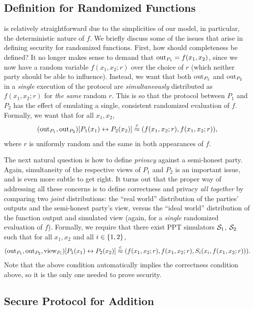 \documentclass[11pt]{article}
\begin{document}
\subsection{Definition for Randomized Functions}
\label{sec:defin-rand-funct}

 is relatively straightforward due to
the simplicities of our model, in particular, the deterministic nature
of $f$.  We briefly discuss some of the issues that arise in defining
security for randomized functions.  First, how should completeness be
defined?  It no longer makes sense to demand that $\text{out}_{P_{1}} =
f(x_{1}, x_{2})$, since we now have a random variable $f(x_{1}, x_{2};
r)$ over the choice of $r$ (which neither party should be able to
influence).  Instead, we want that both $\text{out}_{P_{1}}$ and
$\text{out}_{P_{2}}$ in a \emph{single} execution of the protocol are
\emph{simultaneously} distributed as $f(x_{1}, x_{2}; r)$ for
\emph{the same} random $r$.  This is so that the protocol between
$P_{1}$ and $P_{2}$ has the effect of emulating a single, consistent
randomized evaluation of $f$.  Formally, we want that for all $x_{1},
x_{2}$, \[ (\text{out}_{P_{1}}, \text{out}_{P_{2}})[P_{1}(x_{1}) \leftrightarrow
P_{2}(x_{2})] \stackrel{c}{\approx} (f(x_{1}, x_{2}; r), f(x_{1}, x_{2}; r)), \]
where $r$ is uniformly random and the same in both appearances of $f$.

The next natural question is how to define \emph{privacy} against a
semi-honest party.  Again, simultaneity of the respective views of
$P_{1}$ and $P_{2}$ is an important issue, and is even more subtle to
get right.  It turns out that the proper way of addressing all these
concerns is to define correctness and privacy \emph{all together} by
comparing two \emph{joint} distributions: the ``real world''
distribution of the parties' outputs and the semi-honest party's view,
versus the ``ideal world'' distribution of the function output and
simulated view (again, for a \emph{single} randomized evaluation of
$f$).  Formally, we require that there exist PPT simulators
$\mathcal{S}_{1}$, $\mathcal{S}_{2}$ such that for all $x_{1}, x_{2}$ and all $i \in
\{1,2\}$, \[ (\text{out}_{P_{1}}, \text{out}_{P_{2}},\text{view}_{P_i})[P_1(x_1)
\leftrightarrow P_2(x_2)] \stackrel{c}{\approx} (f(x_{1}, x_{2}; r),
f(x_1,x_2;r),S_i(x_i,f(x_1,x_2;r))). \] Note that the above condition
automatically implies the correctness condition above, so it is the
only one needed to prove security.

\subsection{Secure Protocol for Addition}
\label{sec:secure-prot-addit}
\end{document}
